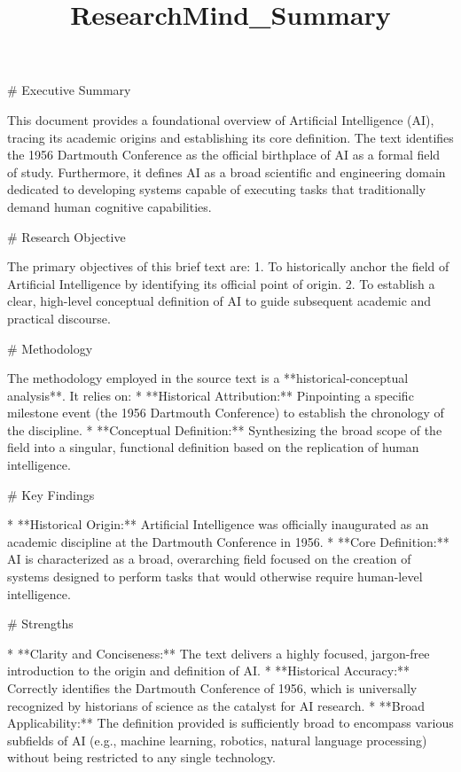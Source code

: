 \documentclass{article}
\begin{document}
\title{ResearchMind_Summary}

\maketitle

# Executive Summary

This document provides a foundational overview of Artificial Intelligence (AI), tracing its academic origins and establishing its core definition. The text identifies the 1956 Dartmouth Conference as the official birthplace of AI as a formal field of study. Furthermore, it defines AI as a broad scientific and engineering domain dedicated to developing systems capable of executing tasks that traditionally demand human cognitive capabilities. 

# Research Objective

The primary objectives of this brief text are:
1. To historically anchor the field of Artificial Intelligence by identifying its official point of origin.
2. To establish a clear, high-level conceptual definition of AI to guide subsequent academic and practical discourse.

# Methodology

The methodology employed in the source text is a **historical-conceptual analysis**. It relies on:
* **Historical Attribution:** Pinpointing a specific milestone event (the 1956 Dartmouth Conference) to establish the chronology of the discipline.
* **Conceptual Definition:** Synthesizing the broad scope of the field into a singular, functional definition based on the replication of human intelligence.

# Key Findings

* **Historical Origin:** Artificial Intelligence was officially inaugurated as an academic discipline at the Dartmouth Conference in 1956.
* **Core Definition:** AI is characterized as a broad, overarching field focused on the creation of systems designed to perform tasks that would otherwise require human-level intelligence.

# Strengths

* **Clarity and Conciseness:** The text delivers a highly focused, jargon-free introduction to the origin and definition of AI.
* **Historical Accuracy:** Correctly identifies the Dartmouth Conference of 1956, which is universally recognized by historians of science as the catalyst for AI research.
* **Broad Applicability:** The definition provided is sufficiently broad to encompass various subfields of AI (e.g., machine learning, robotics, natural language processing) without being restricted to any single technology.
\end{document}

